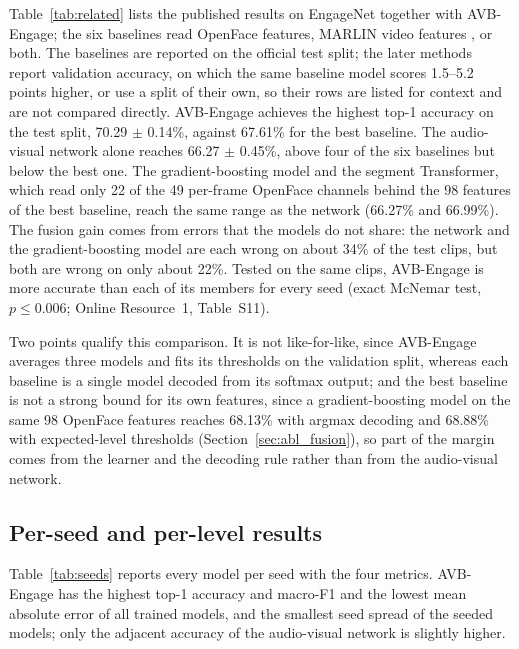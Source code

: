 \documentclass[pdflatex,iicol,sn-basic]{sn-jnl}
\newcommand{\ournet}{AVB-Engage}
\begin{document}
Table~\ref{tab:related} lists the published results on EngageNet together with \ournet{}; the six baselines read OpenFace features, MARLIN video features \citep{cai2023marlin}, or both. The baselines are reported on the official test split; the later methods report validation accuracy, on which the same baseline model scores 1.5--5.2 points higher, or use a split of their own, so their rows are listed for context and are not compared directly. \ournet{} achieves the highest top-1 accuracy on the test split, 70.29 $\pm$ 0.14\%, against 67.61\% for the best baseline. The audio-visual network alone reaches 66.27 $\pm$ 0.45\%, above four of the six baselines but below the best one. The gradient-boosting model and the segment Transformer, which read only 22 of the 49 per-frame OpenFace channels behind the 98 features of the best baseline, reach the same range as the network (66.27\% and 66.99\%). The fusion gain comes from errors that the models do not share: the network and the gradient-boosting model are each wrong on about 34\% of the test clips, but both are wrong on only about 22\%. Tested on the same clips, \ournet{} is more accurate than each of its members for every seed (exact McNemar test, $p \le 0.006$; Online Resource~1, Table~S11).

Two points qualify this comparison. It is not like-for-like, since \ournet{} averages three models and fits its thresholds on the validation split, whereas each baseline is a single model decoded from its softmax output; and the best baseline is not a strong bound for its own features, since a gradient-boosting model on the same 98 OpenFace features reaches 68.13\% with argmax decoding and 68.88\% with expected-level thresholds (Section~\ref{sec:abl_fusion}), so part of the margin comes from the learner and the decoding rule rather than from the audio-visual network.

\subsection{Per-seed and per-level results}\label{sec:res_seed}

Table~\ref{tab:seeds} reports every model per seed with the four metrics. \ournet{} has the highest top-1 accuracy and macro-F1 and the lowest mean absolute error of all trained models, and the smallest seed spread of the seeded models; only the adjacent accuracy of the audio-visual network is slightly higher.
\end{document}
